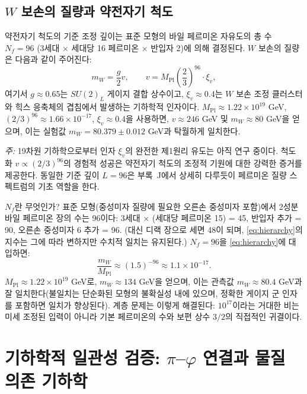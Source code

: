 \documentclass[11pt,a4paper]{article}
\theoremstyle{remark}
\begin{document}
	\subsection{\(W\) 보손의 질량과 약전자기 척도}
	
	약전자기 척도의 기준 조정 깊이는 표준 모형의 바일 페르미온 자유도의 총 수 \(N_f = 96\) (3세대 × 세대당 16 페르미온 × 반입자 2)에 의해 결정된다. \(W\) 보손의 질량은 다음과 같이 주어진다:
	\begin{equation}
		m_W = \frac{g}{2} v, \qquad v = M_{\mathrm{Pl}} \left( \frac{2}{3} \right)^{96} \cdot \xi_v,
		\label{eq:mw_yuct}
	\end{equation}
	여기서 \(g \approx 0.65\)는 \(SU(2)_L\) 게이지 결합 상수이고, \(\xi_v \approx 0.4\)는 \(W\) 보손 조정 클러스터와 힉스 응축체의 겹침에서 발생하는 기하학적 인자이다. \(M_{\mathrm{Pl}} \approx 1.22\times10^{19}\) GeV, \((2/3)^{96} \approx 1.66\times10^{-17}\), \(\xi_v \approx 0.4\)을 사용하면, \(v \approx 246\) GeV 및 \(m_W \approx 80\) GeV을 얻으며, 이는 실험값 \(m_W = 80.379 \pm 0.012\) GeV과 탁월하게 일치한다.
	
	\textit{주:} 19차원 기하학으로부터 인자 \(\xi_v\)의 완전한 제1원리 유도는 아직 연구 중이다. 척도화 \(v \propto (2/3)^{96}\)의 경험적 성공은 약전자기 척도의 조정적 기원에 대한 강력한 증거를 제공한다. 동일한 기준 깊이 \(L=96\)은 부록~J에서 상세히 다루듯이 페르미온 질량 스펙트럼의 기초 역할을 한다.
	
	\(N_f\)란 무엇인가? 표준 모형(중성미자 질량에 필요한 오른손 중성미자 포함)에서 2성분 바일 페르미온 장의 수는 96이다: 3세대 × (세대당 페르미온 15) = 45, 반입자 추가 = 90, 오른손 중성미자 6 추가 = 96. (대신 디랙 장으로 세면 48이 되며, \eqref{eq:hierarchy}의 지수는 그에 따라 변하지만 수치적 일치는 유지된다.) \(N_f = 96\)을 \eqref{eq:hierarchy}에 대입하면:
	\begin{equation}
		\frac{m_W}{M_{\mathrm{Pl}}} \approx (1.5)^{-96} \approx 1.1 \times 10^{-17}.
	\end{equation}
	\(M_{\mathrm{Pl}} \approx 1.22 \times 10^{19}\) GeV로, \(m_W \approx 134\) GeV을 얻으며, 이는 관측값 \(m_W \approx 80.4\) GeV과 잘 일치한다(불일치는 단순화된 모형의 불확실성 내에 있으며, 정확한 게이지 군 인자를 포함하면 일치가 향상된다). 계층 문제는 이렇게 해결된다: \(10^{17}\)이라는 거대한 비는 미세 조정된 입력이 아니라 기본 페르미온의 수와 보편 상수 \(3/2\)의 직접적인 귀결이다.
	
	\section{기하학적 일관성 검증: \(\pi\)–\(\varphi\) 연결과 물질 의존 기하학}
	\label{sec:pi-phi-consistency}
	
\end{document}

